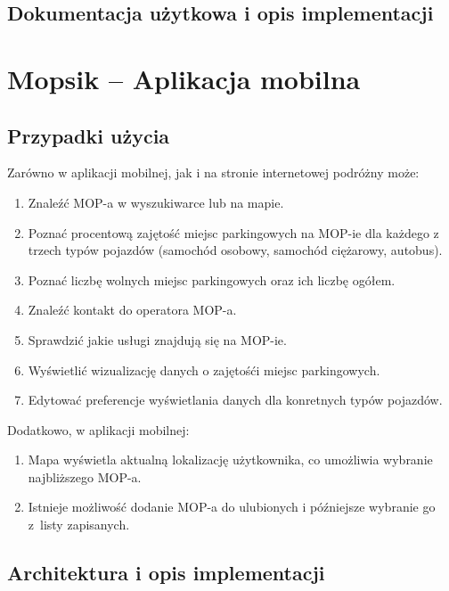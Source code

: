 \section{Dokumentacja użytkowa i opis implementacji}

\chapter{Mopsik -- Aplikacja mobilna}

\section{Przypadki użycia}
Zarówno w aplikacji mobilnej, jak i na stronie internetowej podróżny może:
\begin{enumerate}
\item Znaleźć MOP-a w wyszukiwarce lub na mapie.
\item Poznać procentową zajętość miejsc parkingowych na MOP-ie dla każdego z trzech typów pojazdów (samochód osobowy, samochód ciężarowy, autobus).
\item Poznać liczbę wolnych miejsc parkingowych oraz ich liczbę ogółem.
\item Znaleźć kontakt do operatora MOP-a.
\item Sprawdzić jakie usługi znajdują się na MOP-ie.
\item Wyświetlić wizualizację danych o zajętośći miejsc parkingowych.
\item Edytować preferencje wyświetlania danych dla konretnych typów pojazdów.
\end{enumerate}
Dodatkowo, w aplikacji mobilnej:
\begin{enumerate}
\item Mapa wyświetla aktualną lokalizację użytkownika, co umożliwia wybranie najbliższego MOP-a. 
\item Istnieje możliwość dodanie MOP-a do ulubionych i późniejsze wybranie go z~listy zapisanych.
\end{enumerate}


\section{Architektura i opis implementacji}

